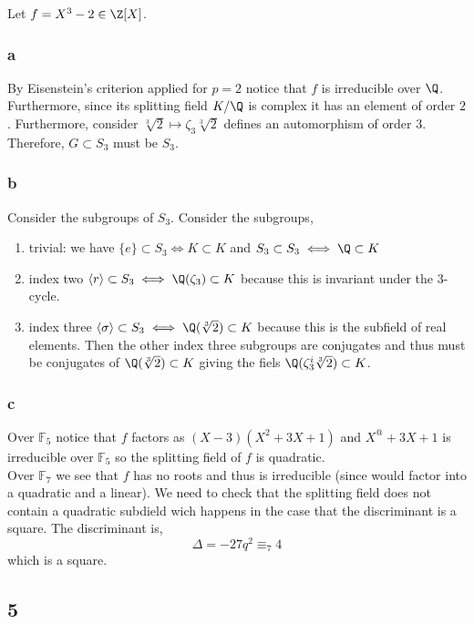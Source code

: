 \documentclass[12pt]{article}
\renewcommand{\F}{\mathbb{F}}
\begin{document}
Let $f = X^3 - 2 \in \Z[X]$. 

\subsubsection{a}

By Eisenstein's criterion applied for $p = 2$ notice that $f$ is irreducible over $\Q$. Furthermore, since its splitting field $K / \Q$ is complex it has an element of order $2$. Furthermore, consider $\sqrt[3]{2} \mapsto \zeta_3 \sqrt[3]{2}$ defines an automorphism of order $3$. Therefore, $G \subset S_3$ must be $S_3$.

\subsubsection{b}

Consider the subgroups of $S_3$. Consider the subgroups,
\begin{enumerate}
\item trivial: we have $\{ e \} \subset S_3 \iff K \subset K$ and $S_3 \subset S_3 \iff \Q \subset K$
\item index two $\left< r \right> \subset S_3 \iff \Q(\zeta_3) \subset K$ because this is invariant under the $3$-cycle.
\item index three $\left< \sigma \right> \subset S_3 \iff \Q(\sqrt[3]{2}) \subset K$ because this is the subfield of real elements. Then the other index three subgroups are conjugates and thus must be conjugates of $\Q(\sqrt[3]{2}) \subset K$ giving the fiels $\Q(\zeta_3^i \sqrt[3]{2}) \subset K$.
\end{enumerate}

\subsubsection{c}

Over $\F_5$ notice that $f$ factors as $(X - 3)(X^2 + 3 X + 1)$ and $X^@ + 3 X + 1$ is irreducible over $\F_5$ so the splitting field of $f$ is quadratic. 
\bigskip\\
Over $\F_7$ we see that $f$ has no roots and thus is irreducible (since would factor into a quadratic and a linear). We need to check that the splitting field does not contain a quadratic subdield wich happens in the case that the discriminant is a square. The discriminant is,
\[ \Delta = - 27 q^2 \equiv_7 4 \]
which is a square. 

\subsection{5}
\end{document}
